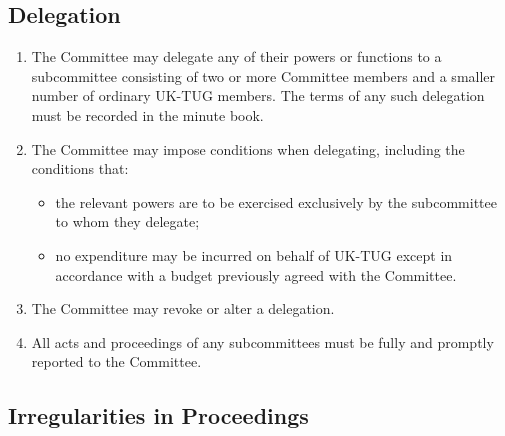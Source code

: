 \documentclass[a4paper,11pt]{article}
\begin{document}
\subsection{Delegation}

\begin{enumerate}
\item The Committee may delegate any of their powers or functions to a
  subcommittee consisting of two or more Committee members and a smaller number
  of ordinary UK-TUG members. The terms of any such delegation must be recorded
  in the minute book.
\item The Committee may impose conditions when delegating, including the
  conditions that:
  \begin{itemize}
  \item the relevant powers are to be exercised exclusively by the subcommittee
    to whom they delegate;
  \item no expenditure may be incurred on behalf of UK-TUG except in accordance
    with a budget previously agreed with the Committee.
  \end{itemize}
\item The Committee may revoke or alter a delegation.
\item All acts and proceedings of any subcommittees must be fully and promptly
  reported to the Committee.
\end{enumerate}

\subsection{Irregularities in Proceedings}
\end{document}

